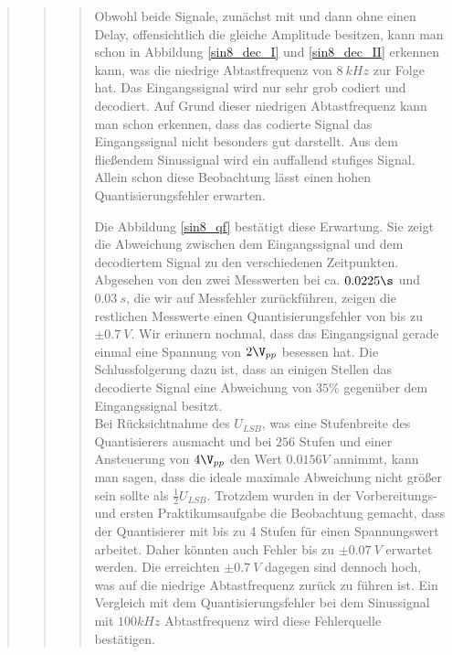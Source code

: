 \begin{quote}
\begin{quote}
\begin{quote}
            Obwohl beide Signale, zunächst mit und dann ohne einen Delay,
            offensichtlich die gleiche Amplitude besitzen, kann man schon in Abbildung \ref{sin8_dec_I}
            und \ref{sin8_dec_II} erkennen kann, was die niedrige
            Abtastfrequenz von $8 \ kHz$ zur Folge hat. Das Eingangssignal wird 
            nur sehr grob codiert und decodiert. Auf Grund dieser niedrigen Abtastfrequenz 
            kann man schon erkennen, dass das codierte Signal das Eingangssignal
            nicht besonders gut darstellt. Aus dem fließendem Sinussignal wird ein auffallend 
            stufiges Signal.\\
            Allein schon diese Beobachtung lässt einen hohen
            Quantisierungsfehler erwarten.
            
            \vspace{1em}
            
            Die Abbildung \ref{sin8_qf} bestätigt diese Erwartung. Sie zeigt die Abweichung 
            zwischen dem Eingangssignal und dem decodiertem Signal zu den
            verschiedenen Zeitpunkten. Abgesehen von den zwei Messwerten bei ca.
            $0.0225 \s$ und $0.03 \ s$, die wir auf Messfehler zurückführen, zeigen die 
            restlichen Messwerte einen Quantisierungsfehler von bis zu $\pm 0.7
            \ V$. Wir erinnern nochmal, dass das Eingangsignal gerade einmal eine Spannung 
            von $2 \V_{pp}$ besessen hat. Die Schlussfolgerung dazu ist, dass an einigen Stellen 
            das decodierte Signal eine Abweichung von $35 \%$ gegenüber dem
            Eingangssignal besitzt.\\ 
            Bei Rücksichtnahme des $U_{LSB}$, was eine
            Stufenbreite des Quantisierers ausmacht und bei $256$ Stufen und
            einer Ansteuerung von $4 \V_{pp}$ den Wert $0.0156 V$ annimmt, kann
            man sagen, dass die ideale maximale Abweichung nicht größer sein
            sollte als $\frac{1}{2} U_{LSB}$. Trotzdem wurden in der
            Vorbereitungs- und ersten Praktikumsaufgabe die Beobachtung
            gemacht, dass der Quantisierer mit bis zu 4 Stufen für einen
            Spannungswert arbeitet. Daher könnten auch Fehler bis zu $\pm 0.07\
            V$ erwartet werden. Die erreichten $\pm 0.7\ V$ dagegen sind dennoch
            hoch, was auf die niedrige Abtastfrequenz zurück zu führen
            ist. Ein Vergleich mit dem Quantisierungsfehler bei dem Sinussignal
            mit $100kHz$ Abtastfrequenz wird diese Fehlerquelle bestätigen.
            

\end{quote}
\end{quote}
\end{quote}
